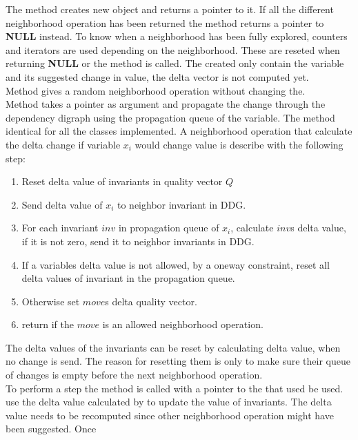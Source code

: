 The method  creates new  object and returns a pointer to it. If all the 
different neighborhood operation has been returned the method returns a pointer to \textbf{NULL} instead. To know when 
a neighborhood has been fully explored, counters and iterators are used depending on the neighborhood. These are 
reseted when returning \textbf{NULL} or the method  is called. The  created only 
contain the variable and its suggested change in value, the delta vector is not computed yet. \\ 
Method  gives a random neighborhood operation without changing the.  \\ 
Method  takes a  pointer as argument and propagate the change through the 
dependency digraph using the propagation queue of the variable. The method identical for all the  
classes implemented. A neighborhood operation that calculate the delta change if variable $x_i$ would change value is 
describe with the following step:
\begin{enumerate} 
 \item Reset delta value of invariants in quality vector $Q$
 \item Send delta value of $x_i$ to neighbor invariant in DDG.
 \item For each invariant $inv$ in propagation queue of $x_i$, calculate $inv$s delta value, if it is not zero, send 
it to neighbor invariants in DDG. 
 \item If a variables delta value is not allowed, by a oneway constraint, reset all delta values of invariant in 
the propagation queue.
 \item Otherwise set $move$s delta quality vector. 
\item return if the $move$ is an allowed neighborhood operation. 
\end{enumerate}
The delta values of the invariants can be reset by calculating delta value, when no change is send. The reason for 
resetting them is only to make sure their queue of changes is empty before the next neighborhood operation. \\ 
To perform a step the method  is called with a pointer to the  that used be used.  
 use the delta value calculated by  to update the value of 
invariants. The delta value needs to be recomputed since other neighborhood operation might have been suggested. Once 
